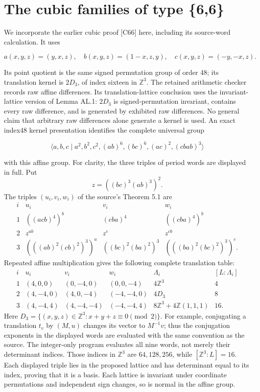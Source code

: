 \section{The cubic families of type \{6,6\}}\label{the-reused-66-calculation}

We incorporate the earlier cubic proof {[}C66{]} here, including its source-word calculation. It uses

\[a(x,y,z)=(y,x,z),\quad b(x,y,z)=(1-x,z,y),\quad
c(x,y,z)=(-y,-x,z).\tag{17}\]

Its point quotient is the same signed permutation group of order 48;
its translation kernel is \(2D_3\), of index sixteen in \(\mathbb Z^3\).
The retained arithmetic checker records raw affine differences. Its
translation-lattice conclusion uses the invariant-lattice version of
Lemma AL.1: \(2D_3\) is signed-permutation invariant, contains every raw
difference, and is generated by exhibited raw differences. No general
claim that arbitrary raw differences alone generate a kernel is used.
An exact index48 kernel presentation identifies the complete universal
group

\[\langle a,b,c\mid a^2,b^2,c^2,(ab)^6,(bc)^6,(ac)^2,(cbab)^3\rangle
\tag{18}\]

with this affine group. For clarity, the three triples of period words are displayed in full. Put
\[
 z=((bc)^3(ab)^3)^2.
\]
The triples $(u_i,v_i,w_i)$ of the source's Theorem 5.1 are
\[
\begin{array}{c|ccc}
i&u_i&v_i&w_i\\\hline
1&((acb)^4)^b&(cba)^4&((cba)^4)^b\\
2&z^{ab}&z^c&z^{cb}\\
3&(((ab)^2(cb)^2)^3)^a&((bc)^2(ba)^2)^3&(((ba)^2(bc)^2)^3)^c .
\end{array}
\]
Repeated affine multiplication gives the following complete translation table:
\[
\begin{array}{c|ccc|c|c}
i&u_i&v_i&w_i&\Lambda_i&[L:\Lambda_i]\\\hline
1&(4,0,0)&(0,-4,0)&(0,0,-4)&4\mathbb Z^3&4\\
2&(4,-4,0)&(4,0,-4)&(-4,-4,0)&4D_3&8\\
3&(4,-4,4)&(4,-4,-4)&(-4,-4,4)&8\mathbb Z^3+4\mathbb Z(1,1,1)&16 .
\end{array}
\]
Here $D_3=\{(x,y,z)\in\mathbb Z^3:x+y+z\equiv0\pmod2\}$.
For example, conjugating a translation $t_v$ by $(M,u)$ changes its vector to $M^{-1}v$; thus the conjugation exponents in the displayed words are evaluated with the same convention as the source. The integer-only program evaluates all nine words, not merely their determinant indices. Those indices in $\mathbb Z^3$ are $64,128,256$, while $[\mathbb Z^3:L]=16$. Each displayed triple lies in the proposed lattice and has determinant equal to its index, proving that it is a basis. Each lattice is invariant under coordinate permutations and independent sign changes, so is normal in the affine group.

